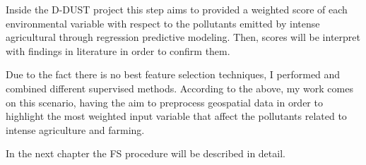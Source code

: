 \bigbreak
Inside the D-DUST project this step aims to provided a weighted score of each environmental variable with respect to the pollutants emitted by intense agricultural through regression predictive modeling. Then, scores will be interpret with findings in literature in order to confirm them.\newline
\par
Due to the fact there is no best feature selection techniques, I performed and combined different supervised methods. 
\bigbreak
According to the above, my work comes on this scenario, having the aim to preprocess geospatial data in order to highlight the most weighted input variable that affect the pollutants related to intense agriculture and farming.\par
In the next chapter the FS procedure will be described in detail.


